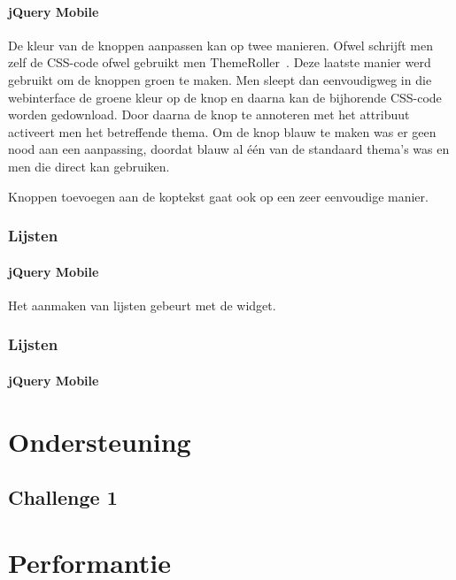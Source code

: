 \paragraph{jQuery Mobile} 
De kleur van de knoppen aanpassen kan op twee manieren. 
Ofwel schrijft men zelf de CSS-code ofwel gebruikt men ThemeRoller~\cite{JQuery2012c}. 
Deze laatste manier werd gebruikt om de knoppen groen te maken. 
Men sleept dan eenvoudigweg in die webinterface de groene kleur op de knop en daarna kan de bijhorende CSS-code worden gedownload. 
Door daarna de knop te annoteren met het  attribuut activeert men het betreffende thema. 
Om de knop blauw te maken was er geen nood aan een aanpassing, doordat blauw al één van de standaard thema's was en men die direct kan gebruiken.

Knoppen toevoegen aan de koptekst gaat ook op een zeer eenvoudige manier.

\subsubsection{Lijsten}

\paragraph{jQuery Mobile} 
Het aanmaken van lijsten gebeurt met de  widget.

\subsubsection{Lijsten}

\paragraph{jQuery Mobile} 

\section{Ondersteuning}
\subsection{Challenge 1}
\section{Performantie}